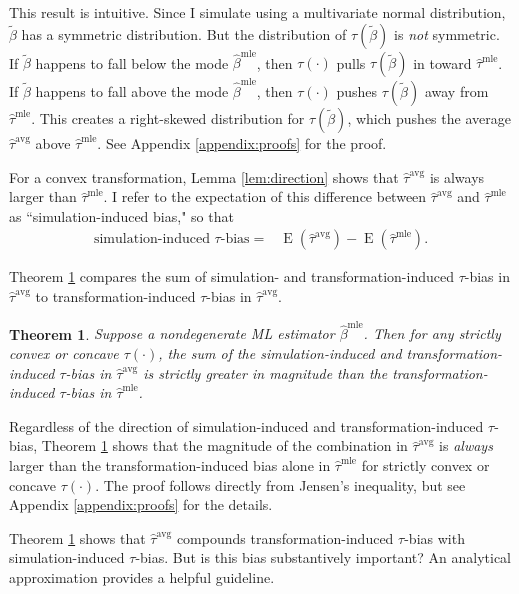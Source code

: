 \documentclass[12pt]{article}
\newtheorem{theorem}{Theorem}
\DeclareMathOperator*{\E}{\text{E}}
\begin{document}
\noindent This result is intuitive. Since I simulate using a multivariate normal distribution, $\tilde{\beta}$ has a symmetric distribution. But the distribution of $\tau(\tilde{\beta})$ is \emph{not} symmetric. If $\tilde{\beta}$ happens to fall below the mode $\hat{\beta}^\text{mle}$, then $\tau(\cdot)$ pulls $\tau(\tilde{\beta})$ in toward $\hat{\tau}^\text{mle}$.
If $\tilde{\beta}$ happens to fall above the mode $\hat{\beta}^\text{mle}$, then $\tau(\cdot)$ pushes $\tau(\tilde{\beta})$ away from $\hat{\tau}^\text{mle}$. This creates a right-skewed distribution for $\tau(\tilde{\beta})$, which pushes the average $\hat{\tau}^\text{avg}$ above $\hat{\tau}^\text{mle}$. See Appendix \ref{appendix:proofs} for the proof.

For a convex transformation, Lemma \ref{lem:direction} shows that $\hat{\tau}^\text{avg}$ is always larger than $\hat{\tau}^\text{mle}$. I refer to the expectation of this difference between $\hat{\tau}^\text{avg}$ and $\hat{\tau}^\text{mle}$ as ``simulation-induced bias," so that
\begin{align*}
\text{simulation-induced } \tau\text{-bias} =& \E\left(\hat{\tau}^\text{avg} \right) - \E\left(\hat{\tau}^\text{mle} \right).
\end{align*}

Theorem \ref{thm:direction} compares the sum of simulation- and transformation-induced $\tau$-bias in $\hat{\tau}^\text{avg}$ to transformation-induced $\tau$-bias in $\hat{\tau}^\text{avg}$.

\begin{theorem}\label{thm:direction}
Suppose a nondegenerate ML estimator $\hat{\beta}^\text{mle}$.
Then for any strictly convex or concave $\tau(\cdot)$, the sum of the simulation-induced and transformation-induced $\tau$-bias in $\hat{\tau}^{\text{avg}}$ is strictly greater in magnitude than the transformation-induced $\tau$-bias in $\hat{\tau}^{\text{mle}}$.
\end{theorem}

\noindent Regardless of the direction of simulation-induced and transformation-induced $\tau$-bias, Theorem \ref{thm:direction} shows that the magnitude of the combination in $\hat{\tau}^{\text{avg}}$ is \textit{always} larger than the transformation-induced bias alone in  $\hat{\tau}^{\text{mle}}$ for strictly convex or concave $\tau(\cdot)$. The proof follows directly from Jensen's inequality, but see Appendix \ref{appendix:proofs} for the details.

Theorem \ref{thm:direction} shows that $\hat{\tau}^\text{avg}$ compounds transformation-induced $\tau$-bias with simulation-induced $\tau$-bias. But is this bias substantively important? An analytical approximation provides a helpful guideline.
\end{document}

